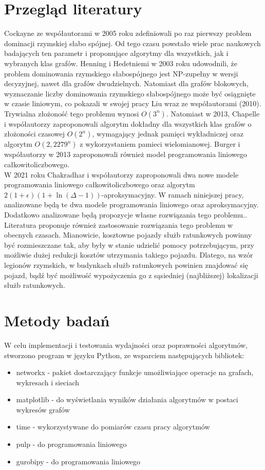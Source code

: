 \section{Przegląd literatury}
Cockayne ze współautorami w 2005 roku zdefiniowali po raz pierwszy problem dominacji rzymskiej słabo spójnej. Od tego czasu powstało wiele prac naukowych badających ten parametr i proponujące algorytmy dla wszystkich, jak i wybranych klas grafów. Henning i Hedetniemi w 2003 roku udowodnili, że problem dominowania rzymskiego słabospójnego jest NP-zupełny w wersji decyzyjnej, nawet dla grafów dwudzielnych. Natomiast dla grafów blokowych, wyznaczanie liczby dominowania rzymskiego słabospójnego może być osiągnięte w czasie liniowym, co pokazali w swojej pracy Liu wraz ze współautorami (2010). \\ 
Trywialna złożoność tego problemu wynosi $O(3^n)$. Natomiast w 2013, Chapelle i współautorzy zaproponowali algorytm dokładny dla wszystkich klas grafów o złożoności czasowej $O(2^n)$, wymagający jednak pamięci wykładniczej oraz algorytm $O(2,2279^n)$ z wykorzystaniem pamieci wielomianowej. Burger i współautorzy w 2013 zaproponowali również model programowania liniowego całkowitoliczbowego. \cite{improvedILP}\\
W 2021 roku Chakradhar i współautorzy zaproponowali dwa nowe modele programowania liniowego całkowitoliczbowego oraz algorytm $2(1+\epsilon)(1 + \ln(\Delta - 1))$-aproksymacyjny. W ramach niniejszej pracy, analizowane będą te dwa modele programowania liniowego oraz aproksymacyjny. Dodatkowo analizowane będą propozycje własne rozwiązania tego problemu.\cite{ILP}.\\
Literatura proponuje również zastosowanie rozwiązania tego problemu w obecnych czasach. Mianowicie, kosztowne pojazdy służb ratunkowych powinny być rozmieszczane tak, aby były w stanie udzielić pomocy potrzebującym, przy możliwie dużej redukcji kosztów utrzymania takiego pojazdu. Dlatego, na wzór legionów rzymskich, w budynkach służb ratunkowych powinien znajdować się pojazd, bądź być możliwość wypożyczenia go z sąsiedniej (najbliższej) lokalizacji służb ratunkowych. \cite{improvedILP}

\section{Metody badań}
W celu implementacji i testowania wydajności oraz poprawności algorytmów, stworzono program w języku Python, ze wsparciem następujących bibliotek:
\begin{itemize}
    \item networkx - pakiet dostarczający funkcje umożliwiające operacje na grafach, wykresach i sieciach
    \item matplotlib - do wyświetlania wyników działania algorytmów w postaci wykresów grafów
    \item time - wykorzystywane do pomiarów czasu pracy algorytmów
    \item pulp - do programowania liniowego
    \item gurobipy - do programowania liniowego
\end{itemize}

